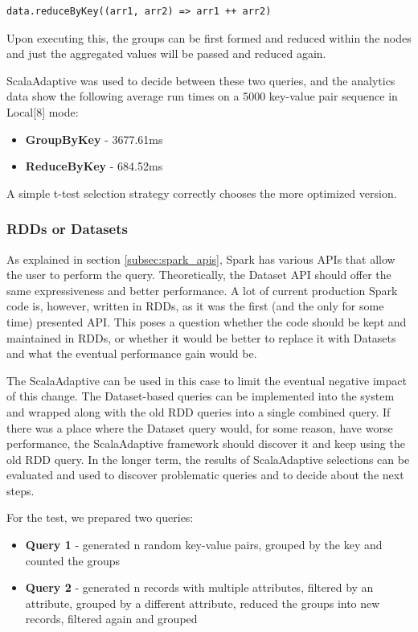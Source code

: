 \lstset{style=Scala}
\begin{lstlisting}
data.reduceByKey((arr1, arr2) => arr1 ++ arr2)
\end{lstlisting}

Upon executing this, the groups can be first formed and reduced within the nodes and just the aggregated values will be passed and reduced again.

ScalaAdaptive was used to decide between these two queries, and the analytics data show the following average run times on a 5000 key-value pair sequence in Local[8] mode:
\begin{itemize}
	\item \textbf{GroupByKey} - 3677.61ms
	\item \textbf{ReduceByKey} - 684.52ms
\end{itemize}

A simple t-test selection strategy correctly chooses the more optimized version.

\subsubsection{RDDs or Datasets}

As explained in section \ref{subsec:spark_apis}, Spark has various APIs that allow the user to perform the query. Theoretically, the Dataset API should offer the same expressiveness and better performance. A lot of current production Spark code is, however, written in RDDs, as it was the first (and the only for some time) presented API. This poses a question whether the code should be kept and maintained in RDDs, or whether it would be better to replace it with Datasets and what the eventual performance gain would be.

The ScalaAdaptive can be used in this case to limit the eventual negative impact of this change. The Dataset-based queries can be implemented into the system and wrapped along with the old RDD queries into a single combined query. If there was a place where the Dataset query would, for some reason, have worse performance, the ScalaAdaptive framework should discover it and keep using the old RDD query. In the longer term, the results of ScalaAdaptive selections can be evaluated and used to discover problematic queries and to decide about the next steps.

For the test, we prepared two queries:
\begin{itemize}
	\item \textbf{Query 1} - generated n random key-value pairs, grouped by the key and counted the groups
	\item \textbf{Query 2} - generated n records with multiple attributes, filtered by an attribute, grouped by a different attribute, reduced the groups into new records, filtered again and grouped
\end{itemize}

